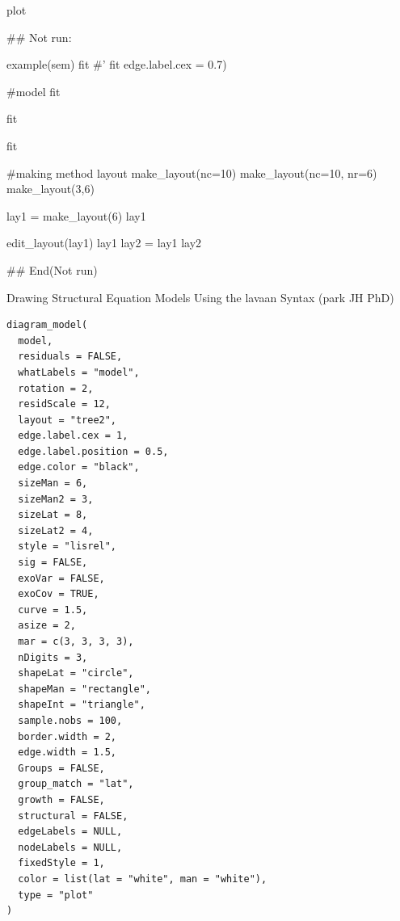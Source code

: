 \documentclass[a4paper]{book}
\begin{document}
%
\begin{Value}
plot
\end{Value}
%
\begin{Examples}
\begin{ExampleCode}

\#\# Not run: 

example(sem)
fit%
#'
fit %
                edge.label.cex = 0.7)

#model
fit %

fit %

fit %

#making method layout
make_layout(nc=10)
make_layout(nc=10, nr=6)
make_layout(3,6)

lay1 = make_layout(6)
lay1

edit_layout(lay1)
lay1 %
lay2 = lay1 %
lay2


## End(Not run)


\end{ExampleCode}
\end{Examples}
%
\begin{Description}
Drawing Structural Equation Models Using the lavaan Syntax (park JH PhD)
\end{Description}
%
\begin{Usage}
\begin{verbatim}
diagram_model(
  model,
  residuals = FALSE,
  whatLabels = "model",
  rotation = 2,
  residScale = 12,
  layout = "tree2",
  edge.label.cex = 1,
  edge.label.position = 0.5,
  edge.color = "black",
  sizeMan = 6,
  sizeMan2 = 3,
  sizeLat = 8,
  sizeLat2 = 4,
  style = "lisrel",
  sig = FALSE,
  exoVar = FALSE,
  exoCov = TRUE,
  curve = 1.5,
  asize = 2,
  mar = c(3, 3, 3, 3),
  nDigits = 3,
  shapeLat = "circle",
  shapeMan = "rectangle",
  shapeInt = "triangle",
  sample.nobs = 100,
  border.width = 2,
  edge.width = 1.5,
  Groups = FALSE,
  group_match = "lat",
  growth = FALSE,
  structural = FALSE,
  edgeLabels = NULL,
  nodeLabels = NULL,
  fixedStyle = 1,
  color = list(lat = "white", man = "white"),
  type = "plot"
)
\end{verbatim}
\end{Usage}
%
\end{document}

